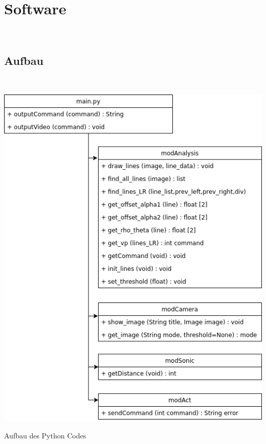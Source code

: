 \documentclass[a4paper,12pt]{article}
\begin{document}
 	\newpage
  
  
  \section{Software}
    \ \\
    \subsection{Aufbau}
    \ \\
    \begin{minipage}{\columnwidth}
      \makeatletter
      \def\@captype{figure}
      \makeatother
      \centering
      \includegraphics[width=0.8\linewidth]{images/code-flowchart.png}
      \caption{Aufbau des Python Codes}
      \label{fig:image-01}
    \end{minipage}
    \ \\
\end{document}

